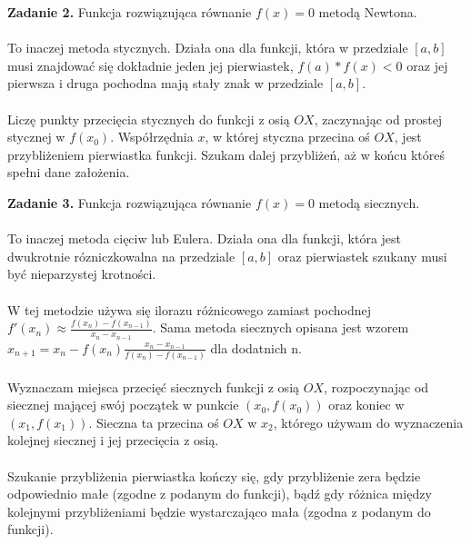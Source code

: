 \documentclass[15pt, a4paper]{article}
\begin{document}
\vspace{0.5cm}

\noindent\hrulefill

\vspace{0.5cm}


\noindent\textbf{Zadanie 2.} Funkcja rozwiązująca równanie \( f(x) = 0 \) metodą Newtona.\\\\
\noindent To inaczej metoda stycznych. Działa ona dla funkcji, która w przedziale \([a, b]\) musi znajdować się dokładnie jeden jej pierwiastek,  \(f(a) * f(x) < 0 \) oraz jej pierwsza i druga pochodna mają stały znak w przedziale \( [a, b] \).\\\\
\noindent Liczę punkty przecięcia stycznych do funkcji z osią \( OX \), zaczynając od prostej stycznej w \( f(x_0) \). Współrzędnia \(x\), w której styczna przecina oś \(OX\), jest przybliżeniem pierwiastka funkcji. Szukam dalej przybliżeń, aż w końcu któreś spełni dane założenia. 

\vspace{0.5cm}

\noindent\hrulefill

\vspace{0.5cm}


\noindent\textbf{Zadanie 3.} Funkcja rozwiązująca równanie \( f(x) = 0 \) metodą siecznych.\\\\
\noindent To inaczej metoda cięciw lub Eulera. Działa ona dla funkcji, która jest dwukrotnie rózniczkowalna na przedziale \([a, b]\) oraz pierwiastek szukany musi być nieparzystej krotności. \\\\
\noindent W tej metodzie używa się ilorazu różnicowego zamiast pochodnej \(f'(x_n) \approx \frac{f(x_n) - f(x_{n-1})}{x_n - x_{n-1}}\). Sama metoda siecznych opisana jest wzorem \(x_{n+1} = x_n - f(x_n) \frac{x_n - x_{n-1}}{f(x_n) - f(x_{n-1})}\) dla dodatnich n.\\\\
\noindent Wyznaczam miejsca przecięć siecznych funkcji z osią \(OX\), rozpoczynając od siecznej mającej swój początek w punkcie \((x_0, f(x_0))\) oraz koniec w \((x_1, f(x_1))\). Sieczna ta przecina oś \(OX\) w \(x_2\), którego używam do wyznaczenia kolejnej siecznej i jej przecięcia z osią. \\\\
\noindent Szukanie przybliżenia pierwiastka kończy się, gdy przybliżenie zera będzie odpowiednio małe (zgodne z podanym do funkcji), bądź gdy różnica między kolejnymi przybliżeniami będzie wystarczająco mała (zgodna z podanym do funkcji).
\end{document}
